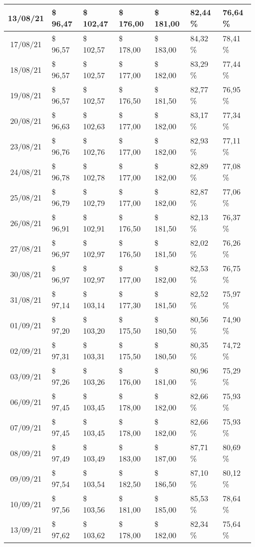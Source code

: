 \begin{center}
\begin{longtable}{|c|p{1.5cm}|p{1.5cm}|p{1.5cm}|p{1.5cm}|p{1.5cm}|p{1.5cm}|}
13/08/21 & \$ 96,47 & \$ 102,47 & \$ 176,00 & \$ 181,00 & 82,44 \% & 76,64 \% \\ \hline
17/08/21 & \$ 96,57 & \$ 102,57 & \$ 178,00 & \$ 183,00 & 84,32 \% & 78,41 \% \\ \hline
18/08/21 & \$ 96,57 & \$ 102,57 & \$ 177,00 & \$ 182,00 & 83,29 \% & 77,44 \% \\ \hline
19/08/21 & \$ 96,57 & \$ 102,57 & \$ 176,50 & \$ 181,50 & 82,77 \% & 76,95 \% \\ \hline
20/08/21 & \$ 96,63 & \$ 102,63 & \$ 177,00 & \$ 182,00 & 83,17 \% & 77,34 \% \\ \hline
23/08/21 & \$ 96,76 & \$ 102,76 & \$ 177,00 & \$ 182,00 & 82,93 \% & 77,11 \% \\ \hline
24/08/21 & \$ 96,78 & \$ 102,78 & \$ 177,00 & \$ 182,00 & 82,89 \% & 77,08 \% \\ \hline
25/08/21 & \$ 96,79 & \$ 102,79 & \$ 177,00 & \$ 182,00 & 82,87 \% & 77,06 \% \\ \hline
26/08/21 & \$ 96,91 & \$ 102,91 & \$ 176,50 & \$ 181,50 & 82,13 \% & 76,37 \% \\ \hline
27/08/21 & \$ 96,97 & \$ 102,97 & \$ 176,50 & \$ 181,50 & 82,02 \% & 76,26 \% \\ \hline
30/08/21 & \$ 96,97 & \$ 102,97 & \$ 177,00 & \$ 182,00 & 82,53 \% & 76,75 \% \\ \hline
31/08/21 & \$ 97,14 & \$ 103,14 & \$ 177,30 & \$ 181,50 & 82,52 \% & 75,97 \% \\ \hline
01/09/21 & \$ 97,20 & \$ 103,20 & \$ 175,50 & \$ 180,50 & 80,56 \% & 74,90 \% \\ \hline
02/09/21 & \$ 97,31 & \$ 103,31 & \$ 175,50 & \$ 180,50 & 80,35 \% & 74,72 \% \\ \hline
03/09/21 & \$ 97,26 & \$ 103,26 & \$ 176,00 & \$ 181,00 & 80,96 \% & 75,29 \% \\ \hline
06/09/21 & \$ 97,45 & \$ 103,45 & \$ 178,00 & \$ 182,00 & 82,66 \% & 75,93 \% \\ \hline
07/09/21 & \$ 97,45 & \$ 103,45 & \$ 178,00 & \$ 182,00 & 82,66 \% & 75,93 \% \\ \hline
08/09/21 & \$ 97,49 & \$ 103,49 & \$ 183,00 & \$ 187,00 & 87,71 \% & 80,69 \% \\ \hline
09/09/21 & \$ 97,54 & \$ 103,54 & \$ 182,50 & \$ 186,50 & 87,10 \% & 80,12 \% \\ \hline
10/09/21 & \$ 97,56 & \$ 103,56 & \$ 181,00 & \$ 185,00 & 85,53 \% & 78,64 \% \\ \hline
13/09/21 & \$ 97,62 & \$ 103,62 & \$ 178,00 & \$ 182,00 & 82,34 \% & 75,64 \% \\ \hline

\end{longtable}
\end{center}
